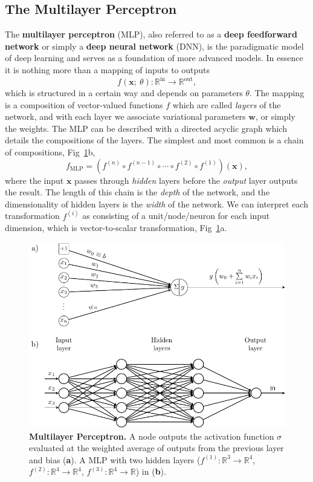 \subsection{The Multilayer Perceptron}
The \textbf{multilayer perceptron} (MLP), also referred to as a \textbf{deep feedforward network} or simply a \textbf{deep neural network} (DNN), is the paradigmatic model of deep learning and serves as a foundation of more advanced models. In essence it is nothing more than a mapping of inputs to outputs
\begin{equation}
	f(\mathbf{x}; ~\theta): \mathbb{R}^\text{in} \rightarrow \mathbb{R}^{\text{out}},
\end{equation}
which is structured in a certain way and depends on parameters $\theta$. The mapping is a composition of vector-valued functions $f$ which are called \emph{layers} of the network, and with each layer we associate variational parameters $\mathbf{w}$, or simply the weights. The MLP can be described with a directed acyclic graph which details the compositions of the layers. The simplest and most common is a chain of compositions, Fig~\ref{fig:mlp}b, 
\begin{equation}
f_{\text{MLP}} = \left(f^{(n)} \circ f^{(n-1)} \circ \cdots \circ f^{(2)} \circ f^{(1)} \right)(\mathbf{x}),
\end{equation}
where the input $\textbf{x}$ passes through \emph{hidden} layers before the \emph{output} layer outputs the result. The length of this chain is the \emph{depth} of the network, and the dimensionality of hidden layers is the \emph{width} of the network. We can interpret each transformation $f^{(i)}$ as consisting of a unit/node/neuron for each input dimension, which is vector-to-scalar transformation, Fig~\ref{fig:mlp}a.
\begin{figure}[H]
	\centering
	\includegraphics[width=\linewidth]{Chapter4/Figs/Vector/mlp.pdf}
	\caption[Multilayer Perceptron]{\textbf{Multilayer Perceptron.} A node outputs the activation function $\sigma$ evaluated at the weighted average of outputs from the previous layer and bias (\textbf{a}). A MLP with two hidden layers ($f^{(1)}: \mathbb{R}^3 \rightarrow \mathbb{R}^4$, $f^{(2)}: \mathbb{R}^4 \rightarrow \mathbb{R}^4$, $f^{(3)}: \mathbb{R}^4 \rightarrow \mathbb{R}$) in (\textbf{b}).}
	\label{fig:mlp}
\end{figure} 
